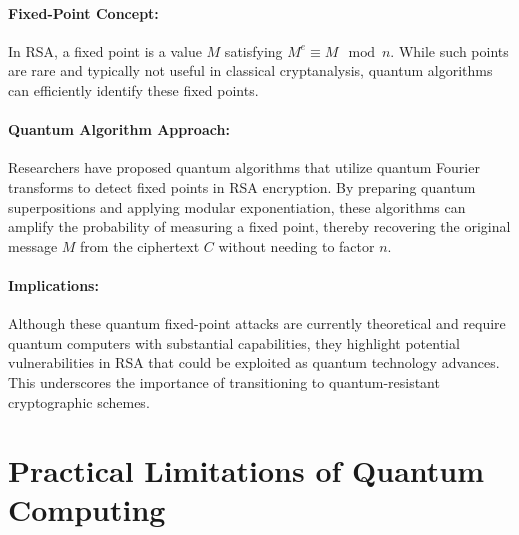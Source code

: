 \documentclass{article}
\begin{document}
\paragraph{Fixed-Point Concept:} In RSA, a fixed point is a value \( M \) satisfying \( M^e \equiv M \mod n \). While such points are rare and typically not useful in classical cryptanalysis, quantum algorithms can efficiently identify these fixed points.

\paragraph{Quantum Algorithm Approach:} Researchers have proposed quantum algorithms that utilize quantum Fourier transforms to detect fixed points in RSA encryption. By preparing quantum superpositions and applying modular exponentiation, these algorithms can amplify the probability of measuring a fixed point, thereby recovering the original message \( M \) from the ciphertext \( C \) without needing to factor \( n \).

\paragraph{Implications:} Although these quantum fixed-point attacks are currently theoretical and require quantum computers with substantial capabilities, they highlight potential vulnerabilities in RSA that could be exploited as quantum technology advances. This underscores the importance of transitioning to quantum-resistant cryptographic schemes.


\section{Practical Limitations of Quantum Computing}
\end{document}
